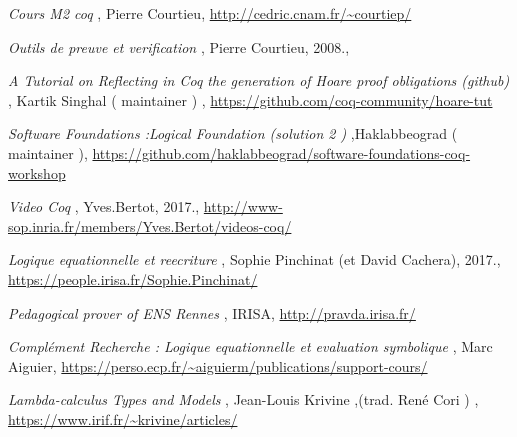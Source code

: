 \documentclass{article}
\begin{document}
\begin{thebibliography}{30}
{\em Cours M2 coq }, {Pierre Courtieu}, 
\url{http://cedric.cnam.fr/~courtiep/}



{\em Outils de preuve et verification }, { Pierre Courtieu, 2008.}, 




{\em A Tutorial on Reflecting in Coq the generation of Hoare proof obligations (github) },{ Kartik Singhal ( maintainer ) },
\url{https://github.com/coq-community/hoare-tut}


{\em Software Foundations :Logical Foundation  (solution 2 ) },{Haklabbeograd ( maintainer )},
\url{https://github.com/haklabbeograd/software-foundations-coq-workshop}

{\em Video Coq }, {Yves.Bertot, 2017.}, 
\url{http://www-sop.inria.fr/members/Yves.Bertot/videos-coq/}



{\em Logique equationnelle et reecriture }, {Sophie Pinchinat (et David Cachera), 2017.}, 
\url{https://people.irisa.fr/Sophie.Pinchinat/}


{\em Pedagogical prover of ENS Rennes }, {IRISA}, 
\url{http://pravda.irisa.fr/}


{\em Complément Recherche : Logique equationnelle et evaluation symbolique }, {Marc Aiguier}, 
\url{https://perso.ecp.fr/~aiguierm/publications/support-cours/}


{\em Lambda-calculus Types and Models }, {Jean-Louis Krivine ,(trad. René Cori ) },
\url{https://www.irif.fr/~krivine/articles/}


\end{thebibliography}
\pagebreak
\end{document}
